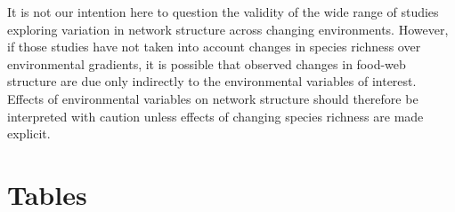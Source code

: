 \documentclass[12pt]{article}
\begin{document}
It is not our intention here to question the validity of the wide range of
studies exploring variation in network structure across changing environments.
However, if those studies have not taken into account changes in species
richness over environmental gradients, it is possible that observed changes in
food-web structure are due only indirectly to the environmental variables of
interest. Effects of environmental variables on network structure should
therefore be interpreted with caution unless effects of changing species
richness are made explicit.


\newpage

\newpage

\section*{Tables}
\end{document}
